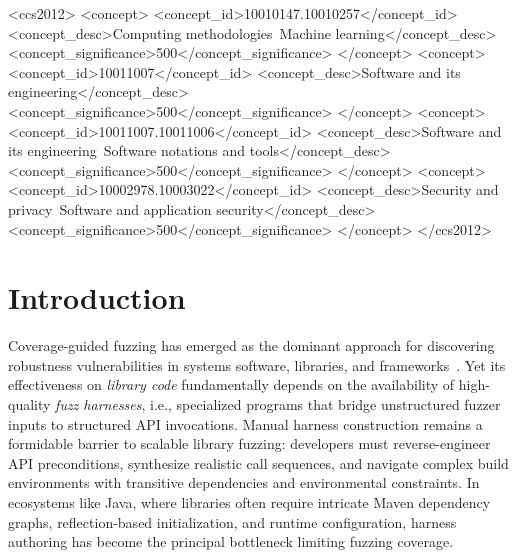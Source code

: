 \documentclass[sigconf,review,anonymous]{acmart}
\begin{document}
\begin{CCSXML}
<ccs2012>
   <concept>
       <concept_id>10010147.10010257</concept_id>
       <concept_desc>Computing methodologies~Machine learning</concept_desc>
       <concept_significance>500</concept_significance>
       </concept>
   <concept>
       <concept_id>10011007</concept_id>
       <concept_desc>Software and its engineering</concept_desc>
       <concept_significance>500</concept_significance>
       </concept>
   <concept>
       <concept_id>10011007.10011006</concept_id>
       <concept_desc>Software and its engineering~Software notations and tools</concept_desc>
       <concept_significance>500</concept_significance>
       </concept>
   <concept>
       <concept_id>10002978.10003022</concept_id>
       <concept_desc>Security and privacy~Software and application security</concept_desc>
       <concept_significance>500</concept_significance>
       </concept>
 </ccs2012>
\end{CCSXML}




\maketitle

\section{Introduction}

Coverage-guided fuzzing has emerged as the dominant approach for discovering robustness vulnerabilities in systems software, libraries, and frameworks~\cite{CITE}. Yet its effectiveness on \emph{library code} fundamentally depends on the availability of high-quality \emph{fuzz harnesses}, i.e., specialized programs that bridge unstructured fuzzer inputs to structured API invocations. Manual harness construction remains a formidable barrier to scalable library fuzzing: developers must reverse-engineer API preconditions, synthesize realistic call sequences, and navigate complex build environments with transitive dependencies and environmental constraints. In ecosystems like Java, where libraries often require intricate Maven dependency graphs, reflection-based initialization, and runtime configuration, harness authoring has become the principal bottleneck limiting fuzzing coverage.
\end{document}
